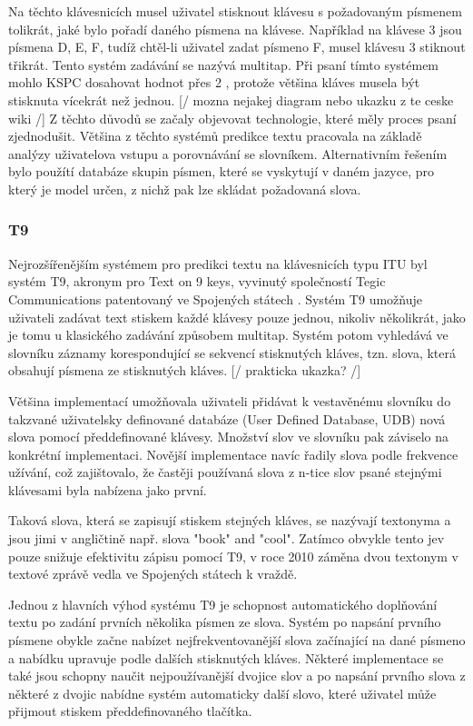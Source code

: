 \documentclass{article}
\begin{document}
Na těchto klávesnicích musel uživatel stisknout klávesu s požadovaným písmenem tolikrát, jaké bylo pořadí daného písmena na klávese. Například na klávese 3 jsou písmena D, E, F, tudíž chtěl-li uživatel zadat písmeno F, musel klávesu 3 stiknout třikrát. Tento systém zadávání se nazývá multitap. Při psaní tímto systémem mohlo KSPC dosahovat hodnot přes 2 \cite{dXVv6nPb2KifFXYv}, protože většina kláves musela být stisknuta vícekrát než jednou. [/ mozna nejakej diagram nebo ukazku z te ceske wiki /] Z těchto důvodů se začaly objevovat technologie, které měly proces psaní zjednodušit. Většina z těchto systémů predikce textu pracovala na základě analýzy uživatelova vstupu a porovnávání se slovníkem. Alternativním řešením bylo použítí databáze skupin písmen, které se vyskytují v daném jazyce, pro který je model určen, z nichž pak lze skládat požadovaná slova.

\subsubsection{T9}

Nejrozšířenějším 
 systémem pro predikci textu na klávesnicích typu ITU byl systém T9, akronym pro Text on 9 keys, vyvinutý společností Tegic Communications \cite{Edq6tEyjOSzk54RQ} patentovaný ve Spojených státech \cite{Grover1998}. Systém T9 umožňuje uživateli zadávat text stiskem každé klávesy pouze jednou, nikoliv několikrát, jako je tomu u klasického zadávání způsobem multitap. Systém potom vyhledává ve slovníku záznamy korespondující se sekvencí stisknutých kláves, tzn. slova, která obsahují písmena ze stisknutých kláves. [/ prakticka ukazka? /]
 

Většina implementací umožňovala uživateli přidávat k vestavěnému slovníku do takzvané uživatelsky definované databáze (User Defined Database, UDB) nová slova pomocí předdefinované klávesy. Množství slov ve slovníku pak záviselo na konkrétní implementaci. Novější implementace navíc řadily slova podle frekvence užívání, což zajištovalo, že častěji používaná slova z n-tice slov psané stejnými klávesami byla nabízena jako první. 

Taková slova, která se zapisují stiskem stejných kláves, se nazývají textonyma \cite{ZORN2007} a jsou jimi v angličtině např. slova "book" and "cool". Zatímco obvykle tento jev pouze snižuje efektivitu zápisu pomocí T9, v roce 2010 záměna dvou textonym v textové zprávě vedla ve Spojených státech k vraždě. \cite{bjjL0GPb5QxyO1A8} 

Jednou z hlavních výhod systému T9 je schopnost automatického doplňování textu po zadání prvních několika písmen ze slova. Systém po napsání prvního písmene obykle začne nabízet nejfrekventovanější slova začínající na dané písmeno a nabídku upravuje podle dalších stisknutých kláves. Některé implementace se také jsou schopny naučit nejpoužívanější dvojice slov a po napsání prvního slova z některé z dvojic nabídne systém automaticky další slovo, které uživatel může přijmout stiskem předdefinovaného tlačítka. \cite{hrzQ70bvKjUBgVml} 
\end{document}
